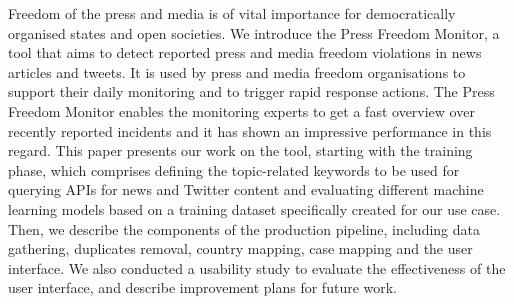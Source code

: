 Freedom of the press and media is of vital importance for democratically organised states and open societies. We introduce the Press Freedom Monitor, a tool that aims to detect reported press and media freedom violations in news articles and tweets. It is used by press and media freedom organisations to support their daily monitoring and to trigger rapid response actions. The Press Freedom Monitor enables the monitoring experts to get a fast overview over recently reported incidents and it has shown an impressive performance in this regard.
This paper presents our work on the tool, starting with the training phase, which comprises defining the topic-related keywords to be used for querying APIs for news and Twitter content and evaluating different machine learning models based on a training dataset specifically created for our use case. Then, we describe the components of the production pipeline, including data gathering, duplicates removal, country mapping, case mapping and the user interface. We also conducted a usability study to evaluate the effectiveness of the user interface, and describe improvement plans for future work.